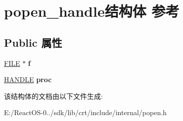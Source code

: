 \hypertarget{structpopen__handle}{}\section{popen\+\_\+handle结构体 参考}
\label{structpopen__handle}
\subsection*{Public 属性}
\begin{DoxyCompactItemize}
\item 
\mbox{\label{structpopen__handle_a17559af86578c2219153d4984baf8dc1}} 
\hyperlink{struct__iobuf}{F\+I\+LE} $\ast$ {\bfseries f}
\item 
\mbox{\label{structpopen__handle_aac0ae040fb961d7eb603a22614fcb8b8}} 
\hyperlink{interfacevoid}{H\+A\+N\+D\+LE} {\bfseries proc}
\end{DoxyCompactItemize}


该结构体的文档由以下文件生成\+:\begin{DoxyCompactItemize}
\item 
E\+:/\+React\+O\+S-\/0../sdk/lib/crt/include/internal/popen.\+h\end{DoxyCompactItemize}
